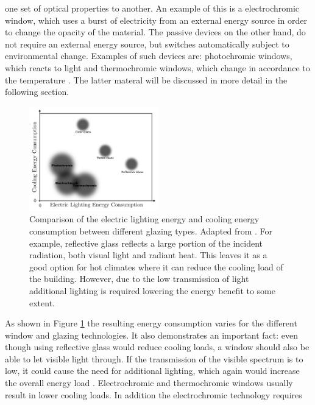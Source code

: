 one set of optical properties to another. An example of this is a electrochromic window, which
uses a burst of electricity from an external energy source in order to change the opacity of the material.
%
The passive devices on the other hand, do not require an external energy source, but switches automatically
subject to environmental change. Examples of such devices are: photochromic windows, which reacts to 
light and thermochromic windows, which change in accordance to the temperature
\cite{Kamalisarvestani2013, Baetens2010}. The latter materal will be discussed in more detail
in the following section.
%
\begin{figure}[h!]
  \centering
   \includegraphics[width=0.5\textwidth]{Figures/chromicGlassComparison.pdf}
   \caption{Comparison of the electric lighting energy and cooling energy consumption between different
      glazing types. Adapted from \cite[p.~20]{Huovila2007}. For example, reflective glass reflects
      a large portion of the incident radiation, both visual light and radiant heat. This leaves it
      as a good option for hot climates where it can reduce the cooling load of the building. However,
      due to the low transmission of light additional lighting is required lowering the energy
      benefit to some extent.
   }
   \label{fig:energyComparison}
\end{figure}
%
As shown in Figure \ref{fig:energyComparison} the resulting energy consumption varies for the different
window and glazing technologies. 
It also demonstrates an important fact: even though using reflective glass would reduce
cooling loads, a window should also be able to let visible light through. If the transmission of
the visible spectrum is to low, it could cause the need for additional lighting, which again
would increase the overall energy load \cite{Correa2004}.
Electrochromic and thermochromic windows usually
result in lower cooling loads. In addition the electrochromic technology requires 
